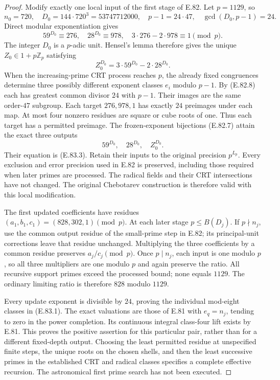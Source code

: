 \begin{proof}
Modify exactly one local input of the first stage of E.82.
Let $p=1129$, so
\[
 n_0=720,\quad D_0=144\cdot720^3=53747712000,
 \quad p-1=24\cdot47,\quad \gcd(D_0,p-1)=24.
\]
Direct modular exponentiation gives
\[
 59^{D_0}\equiv276,\quad28^{D_0}\equiv978,
 \quad3\cdot276-2\cdot978\equiv1\pmod p.
 \tag{E.83.2}
\]
The integer $D_0$ is a $p$-adic unit. Hensel's lemma therefore
gives the unique $Z_0\in1+p\mathbb Z_p$ satisfying
\[
 Z_0^{D_0}=3\cdot59^{D_0}-2\cdot28^{D_0}.
 \tag{E.83.3}
\]
When the increasing-prime CRT process reaches $p$, the already
fixed congruences determine three possibly different exponent
classes $e_i$ modulo $p-1$. By (E.82.8) each has greatest
common divisor $24$ with $p-1$. Their images are the same
order-$47$ subgroup. Each target $276,978,1$ has exactly
$24$ preimages under each map. At most four nonzero residues
are square or cube roots of one. Thus each target has a
permitted preimage. The frozen-exponent bijections (E.82.7)
attain the exact three outputs
\[
                         59^{D_0},\quad28^{D_0},\quad Z_0^{D_0}.
\]
Their equation is (E.83.3). Retain their inputs to the original
precision $p^{L_p}$. Every exclusion and error precision used
in E.82 is preserved, including those required when later
primes are processed. The radical fields and their CRT
intersections have not changed. The original Chebotarev
construction is therefore valid with this local modification.

The first updated coefficients have residues
$(a_1,b_1,c_1)=(828,302,1)\pmod p$.
At each later stage $p\leq B(D_j)$. If $p\nmid n_j$,
use the common output residue of the small-prime step in
E.82; its principal-unit corrections leave that residue
unchanged. Multiplying the three coefficients by a common
residue preserves $a_j/c_j\pmod p$. Once $p\mid n_j$,
each input is one modulo $p$, so all three multipliers
are one modulo $p$ and again preserve the ratio.
All recursive support primes exceed the processed bound;
none equals $1129$. The ordinary limiting ratio is
therefore $828$ modulo $1129$.

Every update exponent is divisible by $24$, proving the
individual mod-eight classes in (E.83.1). The exact valuations
are those of E.81 with $e_q=n_j$, tending to zero in the
power completion. Its continuous integral class-four lift
exists by E.81. This proves the positive assertion for this
particular pair, rather than for a different fixed-depth output.
Choosing the least permitted residue at unspecified finite
steps, the unique roots on the chosen shells, and then the
least successive primes in the established CRT and radical
classes specifies a complete effective recursion. The
astronomical first prime search has not been executed.


\end{proof}
